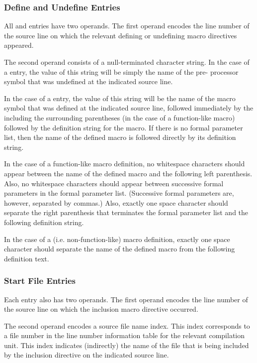 \subsubsection{Define and Undefine Entries}
\label{chap:defineandundefineentries}

All 
\DWMACINFOdefineTARG{} and 
\DWMACINFOundefTARG{} entries have two
operands. The first operand encodes the line number of the
source line on which the relevant defining or undefining
macro directives appeared.

The second operand consists of a null-terminated character
string. In the case of a 
\DWMACINFOundef{} entry, the value
of this string will be simply the name of the pre- processor
symbol that was undefined at the indicated source line.

In the case of a \DWMACINFOdefine{} entry, the value of this
string will be the name of the macro symbol that was defined
at the indicated source line, followed immediately by the 
including the surrounding parentheses (in
the case of a function-like macro) followed by the definition
string for the macro. If there is no formal parameter list,
then the name of the defined macro is followed directly by
its definition string.

In the case of a function-like macro definition, no whitespace
characters should appear between the name of the defined
macro and the following left parenthesis. Also, no whitespace
characters should appear between successive formal parameters
in the formal parameter list. (Successive formal parameters
are, however, separated by commas.) Also, exactly one space
character should separate the right parenthesis that terminates
the formal parameter list and the following definition string.

In the case of a  (i.e. non-function-like) macro
definition, exactly one space character should separate the
name of the defined macro from the following definition text.



\subsubsection{Start File Entries}
\label{chap:startfileentries}
Each \DWMACINFOstartfileTARG{} entry also has two operands. The
first operand encodes the line number of the source line on
which the inclusion macro directive occurred.

The second operand encodes a source file name index. This index
corresponds to a file number in the line number information
table for the relevant compilation unit. This index indicates
(indirectly) the name of the file that is being included by
the inclusion directive on the indicated source line.

